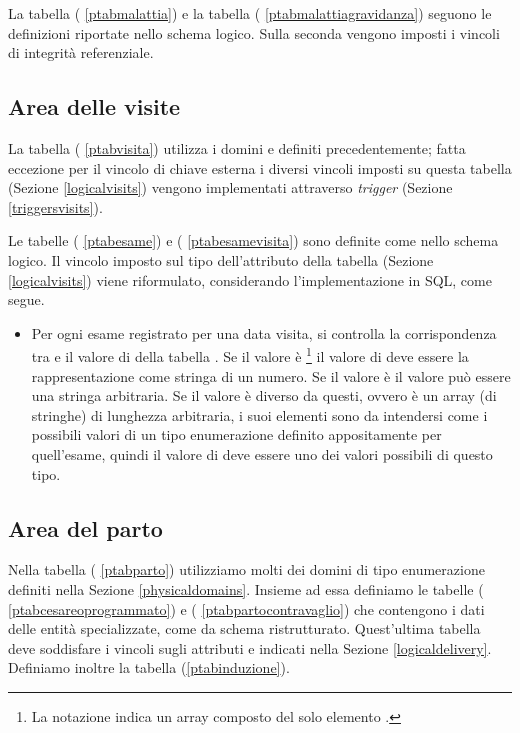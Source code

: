 La tabella  (\lstlistingname{} \ref{ptabmalattia}) e la tabella  (\lstlistingname{} \ref{ptabmalattiagravidanza}) seguono le definizioni riportate nello schema logico.
Sulla seconda vengono imposti i vincoli di integrità referenziale.

\subsection{Area delle visite}
\label{tablesvisits}

La tabella  (\lstlistingname{} \ref{ptabvisita}) utilizza i domini  e  definiti precedentemente; fatta eccezione per il vincolo di chiave esterna i diversi vincoli imposti su questa tabella (Sezione \ref{logicalvisits}) vengono implementati attraverso \emph{trigger} (Sezione \ref{triggersvisits}).

Le tabelle  (\lstlistingname{} \ref{ptabesame}) e  (\lstlistingname{} \ref{ptabesamevisita}) sono definite come nello schema logico.
Il vincolo imposto sul tipo dell'attributo  della tabella  (Sezione \ref{logicalvisits}) viene riformulato, considerando l'implementazione in SQL, come segue.
\begin{itemize}
\item[\Con{}] Per ogni esame registrato per una data visita, si controlla la corrispondenza tra  e il valore di  della tabella . Se il valore è \footnote{
  La notazione  indica un array composto del solo elemento .
} il valore di  deve essere la rappresentazione come stringa di un numero. Se il valore è  il valore può essere una stringa arbitraria. Se il valore è diverso da questi, ovvero è un array (di stringhe) di lunghezza arbitraria, i suoi elementi sono da intendersi come i possibili valori di un tipo enumerazione definito appositamente per quell'esame, quindi il valore di  deve essere uno dei valori possibili di questo tipo.
\end{itemize}

\subsection{Area del parto}

Nella tabella  (\lstlistingname{} \ref{ptabparto}) utilizziamo molti dei domini di tipo enumerazione definiti nella Sezione \ref{physicaldomains}.
Insieme ad essa definiamo le tabelle  (\lstlistingname{} \ref{ptabcesareoprogrammato}) e  (\lstlistingname{} \ref{ptabpartocontravaglio}) che contengono i dati delle entità specializzate, come da schema ristrutturato.
Quest'ultima tabella deve soddisfare i vincoli sugli attributi  e  indicati nella Sezione \ref{logicaldelivery}.
Definiamo inoltre la tabella  (\lstlistingname \ref{ptabinduzione}).

